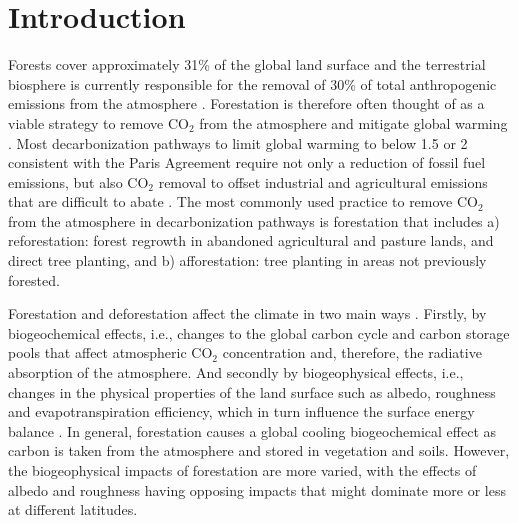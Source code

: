 \documentclass[draft]{agujournal2019}
\begin{document}

\section{Introduction}


Forests cover approximately 31\% of the global land surface \cite{luyssaert_land_2014,fao_global_2020} and the terrestrial biosphere is currently responsible for the removal of 30\% of total anthropogenic emissions from the atmosphere \cite{friedlingstein_global_2022}.
Forestation is therefore often thought of as a viable strategy to remove CO$_2$ from the atmosphere and mitigate global warming \cite{house_maximum_2002, griscom_natural_2017, smith_long-term_2022}.
Most decarbonization pathways to limit global warming to below 1.5 or 2 \textcelsius{}\change{, }{ (}consistent with the Paris Agreement\change{,}{)} require not only a reduction of fossil fuel emissions, but also CO$_2$ removal to offset industrial and agricultural emissions that are difficult to abate \cite{babiker_crosssectoral_2022}.
The most commonly used practice to remove CO$_2$ from the atmosphere in decarbonization pathways is forestation that includes a) reforestation: forest regrowth in abandoned agricultural and pasture lands, and direct tree planting, and b) afforestation: tree planting in areas not previously forested.

Forestation and deforestation affect the climate in two main ways \cite{pongratz_biogeophysical_2010,ito_biogeophysical_2020,zhu_comparable_2023}.
Firstly, by biogeochemical effects, i.e., changes to the global carbon cycle and carbon storage pools that affect atmospheric CO$_2$ concentration and, therefore, the radiative absorption of the atmosphere.
And secondly by biogeophysical effects, i.e., changes in the physical properties of the land surface such as albedo, roughness and evapotranspiration efficiency, which in turn influence the surface energy balance \cite{betts_offset_2000,bala_combined_2007,winckler_importance_2019}.
In general, forestation causes a global cooling biogeochemical effect as carbon is taken from the atmosphere and stored in vegetation and soils.
However, the biogeophysical impacts of forestation are more varied, with the effects of albedo and roughness having opposing impacts that might dominate more or less at different latitudes.
\end{document}
